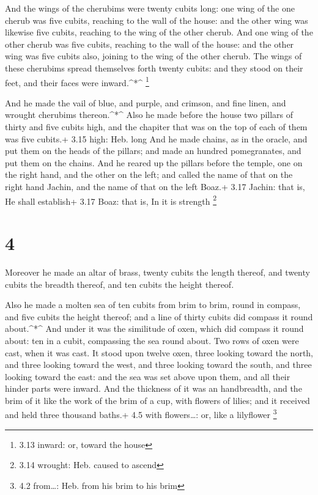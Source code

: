  And the wings of the cherubims were twenty cubits long:
one wing of the one cherub was five cubits, reaching to the wall of the
house: and the other wing was likewise five cubits, reaching to the wing
of the other cherub.  And one wing of the other cherub was
five cubits, reaching to the wall of the house: and the other wing was
five cubits also, joining to the wing of the other cherub. 
The wings of these cherubims spread themselves forth twenty cubits: and
they stood on their feet, and their faces were inward.\^{}*\^{}
\footnote{3.13 inward: or, toward the house}

 And he made the vail of blue, and purple, and crimson, and
fine linen, and wrought cherubims thereon.\^{}*\^{}  Also
he made before the house two pillars of thirty and five cubits high, and
the chapiter that was on the top of each of them was five cubits.+ 3.15
high: Heb. long  And he made chains, as in the oracle, and
put them on the heads of the pillars; and made an hundred pomegranates,
and put them on the chains.  And he reared up the pillars
before the temple, one on the right hand, and the other on the left; and
called the name of that on the right hand Jachin, and the name of that
on the left Boaz.+ 3.17 Jachin: that is, He shall establish+ 3.17 Boaz:
that is, In it is strength \footnote{3.14 wrought: Heb. caused to ascend}

\hypertarget{section-3}{%
\section{4}\label{section-3}}

 Moreover he made an altar of brass, twenty cubits the
length thereof, and twenty cubits the breadth thereof, and ten cubits
the height thereof.

 Also he made a molten sea of ten cubits from brim to brim,
round in compass, and five cubits the height thereof; and a line of
thirty cubits did compass it round about.\^{}*\^{}  And
under it was the similitude of oxen, which did compass it round about:
ten in a cubit, compassing the sea round about. Two rows of oxen were
cast, when it was cast.  It stood upon twelve oxen, three
looking toward the north, and three looking toward the west, and three
looking toward the south, and three looking toward the east: and the sea
was set above upon them, and all their hinder parts were inward.
 And the thickness of it was an handbreadth, and the brim of
it like the work of the brim of a cup, with flowers of lilies; and it
received and held three thousand baths.+ 4.5 with flowers\ldots: or,
like a lilyflower \footnote{4.2 from\ldots: Heb. from his brim to his
  brim}

